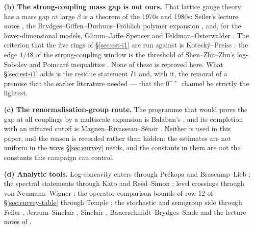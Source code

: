 \noindent\textbf{(b) The strong-coupling mass gap is not ours.} That lattice gauge theory has a mass
gap at large $\beta$ is a theorem of the 1970s and 1980s: Seiler's lecture notes \cite{seiler}, the
Brydges--Giffen--Durhuus--Fr\"ohlich polymer expansion \cite{bgdf}, and, for the lower-dimensional
models, Glimm--Jaffe--Spencer \cite{gjs} and Feldman--Osterwalder \cite{fo}. The criterion that the
five rings of \S\ref{sec:est-i1} are run against is Koteck\'y--Preiss \cite{kp}; the edge $1/48$ of
the strong-coupling window is the threshold of Shen--Zhu--Zhu's log-Sobolev and Poincar\'e
inequalities \cite{szz}. None of
these is reproved here. What \S\ref{sec:est-i1} adds is the residue statement $I1$ and, with it, the
removal of a premise that the earlier literature needed --- that the $0^{++}$ channel be strictly the
lightest.

\noindent\textbf{(c) The renormalisation-group route.} The programme that would prove the gap at all
couplings by a multiscale expansion is Balaban's \cite{balaban,balaban-conv}, and its completion with an infrared
cutoff is Magnen--Rivasseau--S\'enor \cite{mrs}. Neither is used in this paper, and the reason is
recorded rather than hidden: the estimates are not uniform in the ways \S\ref{sec:survey} needs, and
the constants in them are not the constants this campaign can control.

\noindent\textbf{(d) Analytic tools.} Log-concavity enters through Pr\'ekopa \cite{prekopa} and
Brascamp--Lieb \cite{bl}; the spectral statements through Kato \cite{kato} and Reed--Simon
\cite{reed-simon}; level crossings through von Neumann--Wigner \cite{vnw}; the operator-comparison
bounds of row 12 of \S\ref{sec:survey-table} through Temple \cite{temple}; the stochastic and
semigroup side through Feller \cite{feller}, Jerrum--Sinclair \cite{js}, Sinclair \cite{sinclair},
Bauerschmidt--Brydges--Slade \cite{bbs} and the lecture notes of \cite{chatterjee}.

